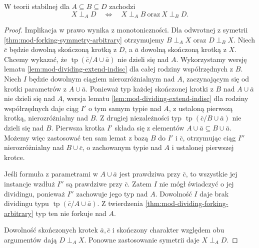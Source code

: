 \begin{twierdzenie}
\label{thm:mod-forking-transitivity-arbitrary}
W teorii stabilnej dla $A\subseteq B\subseteq D$
zachodzi
\[
X\mathrel{\perp_A}D
\quad\Longleftrightarrow\quad
X\mathrel{\perp_A}B\ \text{oraz}\
X\mathrel{\perp_B}D.
\]
\end{twierdzenie}
\begin{proof}
Implikacja w prawo wynika z monotoniczności.
Dla odwrotnej z symetrii
\ref{thm:mod-forking-symmetry-arbitrary}
otrzymujemy
$B\mathrel{\perp_A}X$ oraz
$D\mathrel{\perp_B}X$.
Niech $\bar c$ będzie dowolną skończoną
krotką z $D$, a $\bar a$ dowolną
skończoną krotką z $X$.
Chcemy wykazać, że
$\operatorname{tp}(\bar c/A\cup\bar a)$
nie dzieli się nad $A$.
Wykorzystamy wersję lematu
\ref{lem:mod-dividing-extend-indisc}
dla całej rodziny współrzędnych z $B$.
Niech $I$ będzie dowolnym ciągiem
nierozróżnialnym nad $A$, zaczynającym się
od krotki parametrów z $A\cup\bar a$.
Ponieważ typ każdej skończonej krotki
z $B$ nad $A\cup\bar a$
nie dzieli się nad $A$,
wersja lematu \ref{lem:mod-dividing-extend-indisc}
dla rodziny współrzędnych daje ciąg $I'$
o tym samym typie nad $A$,
z ustaloną pierwszą krotką,
nierozróżnialny nad $B$.
Z drugiej niezależności
typ $\operatorname{tp}(\bar c/B\cup\bar a)$
nie dzieli się nad $B$.
Pierwsza krotka $I'$ składa się z elementów
$A\cup\bar a\subseteq B\cup\bar a$.
Możemy więc zastosować ten sam lemat z bazą $B$
do $I'$ i $\bar c$, otrzymując ciąg $I''$
nierozróżnialny nad $B\cup\bar c$,
o zachowanym typie nad $A$
i ustalonej pierwszej krotce.

Jeśli formuła z parametrami w $A\cup\bar a$
jest prawdziwa przy $\bar c$,
to wszystkie jej instancje wzdłuż $I''$
są prawdziwe przy $\bar c$.
Zatem $I$ nie mógł świadczyć o jej dividingu,
ponieważ $I''$ zachowuje jego typ nad $A$.
Dowolność $I$ daje brak dividingu
typu $\operatorname{tp}(\bar c/A\cup\bar a)$.
Z twierdzenia \ref{thm:mod-dividing-forking-arbitrary}
typ ten nie forkuje nad $A$.

Dowolność skończonych krotek $\bar a,\bar c$
i skończony charakter względem obu argumentów dają
$D\mathrel{\perp_A}X$.
Ponowne zastosowanie symetrii
daje $X\mathrel{\perp_A}D$.
\end{proof}

